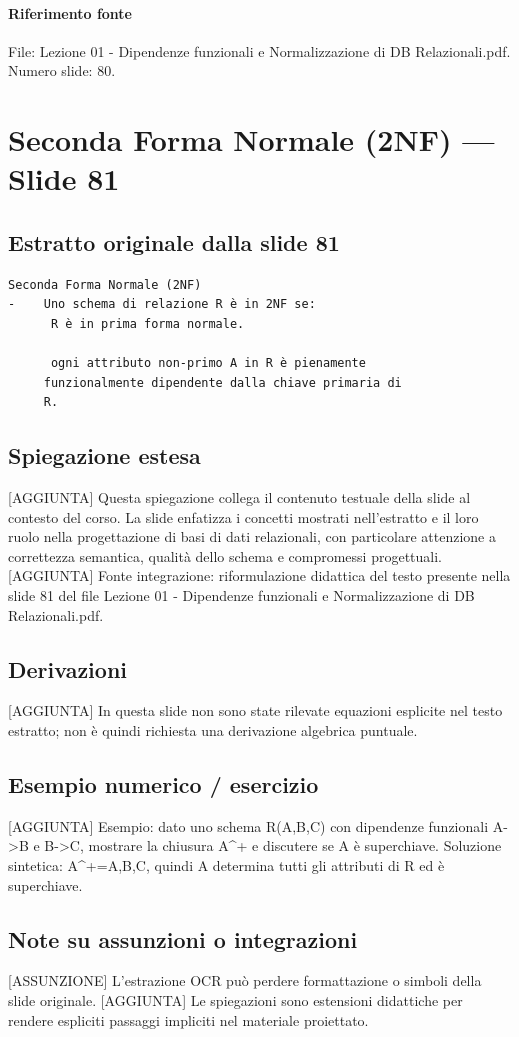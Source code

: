 \documentclass[11pt]{article}
\begin{document}
\paragraph{Riferimento fonte} File: Lezione 01 - Dipendenze funzionali e Normalizzazione di DB Relazionali.pdf. Numero slide: 80.
\section{Seconda Forma Normale (2NF) --- Slide 81}
\subsection*{Estratto originale dalla slide 81}
\begin{lstlisting}
Seconda Forma Normale (2NF)
-    Uno schema di relazione R è in 2NF se:
      R è in prima forma normale.

      ogni attributo non-primo A in R è pienamente
     funzionalmente dipendente dalla chiave primaria di
     R.
\end{lstlisting}
\subsection*{Spiegazione estesa}
[AGGIUNTA] Questa spiegazione collega il contenuto testuale della slide al contesto del corso. La slide enfatizza i concetti mostrati nell'estratto e il loro ruolo nella progettazione di basi di dati relazionali, con particolare attenzione a correttezza semantica, qualità dello schema e compromessi progettuali.
[AGGIUNTA] Fonte integrazione: riformulazione didattica del testo presente nella slide 81 del file Lezione 01 - Dipendenze funzionali e Normalizzazione di DB Relazionali.pdf.
\subsection*{Derivazioni}
[AGGIUNTA] In questa slide non sono state rilevate equazioni esplicite nel testo estratto; non è quindi richiesta una derivazione algebrica puntuale.
\subsection*{Esempio numerico / esercizio}
[AGGIUNTA] Esempio: dato uno schema R(A,B,C) con dipendenze funzionali A->B e B->C, mostrare la chiusura A^+ e discutere se A è superchiave. Soluzione sintetica: A^+={A,B,C}, quindi A determina tutti gli attributi di R ed è superchiave.
\subsection*{Note su assunzioni o integrazioni}
[ASSUNZIONE] L'estrazione OCR può perdere formattazione o simboli della slide originale.
[AGGIUNTA] Le spiegazioni sono estensioni didattiche per rendere espliciti passaggi impliciti nel materiale proiettato.
\end{document}
